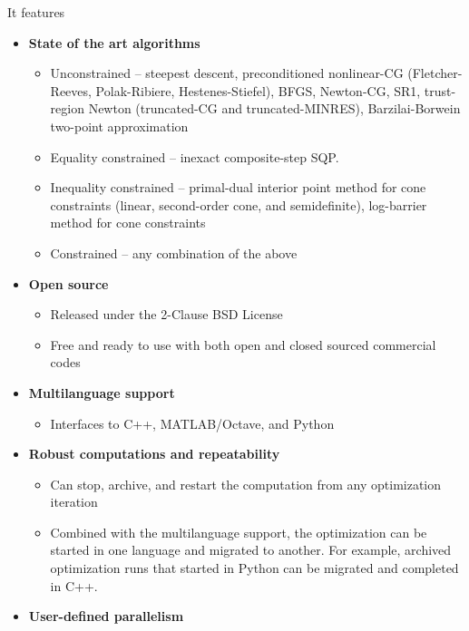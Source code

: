 \documentclass{report}
\begin{document}
\begin{center}
    \usebox{\boxOptimizationTypes}
\end{center}
\noindent It features 
\begin{itemize}
    \item {\bf State of the art algorithms}
        \begin{itemize}
            \item Unconstrained -- steepest descent, preconditioned nonlinear-CG (Fletcher-Reeves, Polak-Ribiere, Hestenes-Stiefel), BFGS, Newton-CG, SR1, trust-region Newton (truncated-CG and truncated-MINRES), Barzilai-Borwein two-point approximation
            \item Equality constrained -- inexact composite-step SQP.
            \item Inequality constrained -- primal-dual interior point method for cone constraints (linear, second-order cone, and semidefinite), log-barrier method for cone constraints
            \item Constrained -- any combination of the above
        \end{itemize}
    \item {\bf Open source}
        \begin{itemize}
            \item Released under the 2-Clause BSD License
            \item Free and ready to use with both open and closed sourced commercial codes
        \end{itemize}
    \item {\bf Multilanguage support}
        \begin{itemize}
            \item Interfaces to C++, MATLAB/Octave, and Python
        \end{itemize}
    \item {\bf Robust computations and repeatability}
        \begin{itemize}
            \item Can stop, archive, and restart the computation from any optimization iteration
            \item Combined with the multilanguage support, the optimization can be started in one language and migrated to another.  For example, archived optimization runs that started in Python can be migrated and completed in C++.
        \end{itemize}
    \item {\bf User-defined parallelism}

\end{itemize}
\end{document}
